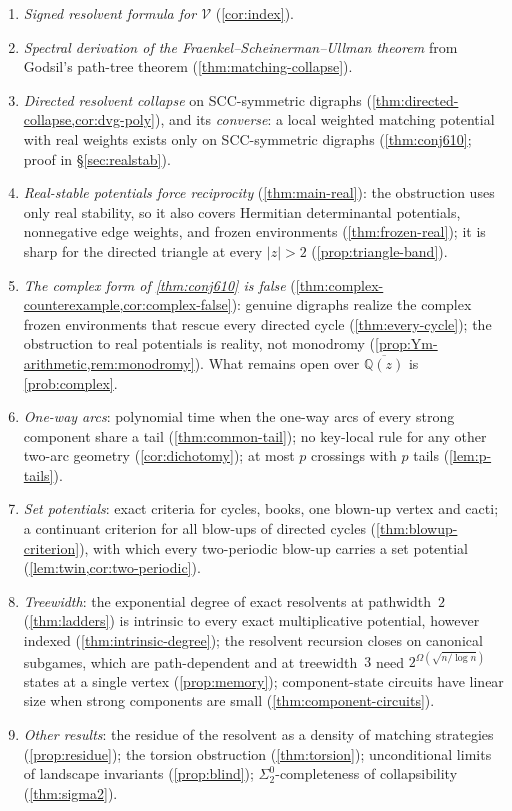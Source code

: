 \documentclass[final]{siamart0516}
\numberwithin{theorem}{section}
\numberwithin{equation}{section}
\theoremstyle{siamnonum}
\theoremstyle{plain}
\newcommand{\QQ}{\mathbb{Q}}
\newcommand{\Qzbar}{\overline{\QQ(z)}}
\newcommand{\val}{\mathcal{V}}            %
\begin{document}
\begin{enumerate}[label=(\arabic*)]
\item \emph{Signed resolvent formula for $\val$} (\cref{cor:index}).
\item \emph{Spectral derivation of the Fraenkel--Scheinerman--Ullman theorem} from Godsil's path-tree theorem (\cref{thm:matching-collapse}).
\item \emph{Directed resolvent collapse} on SCC-symmetric digraphs (\cref{thm:directed-collapse,cor:dvg-poly}), and its \emph{converse}: a local weighted matching potential with real weights exists only on SCC-symmetric digraphs (\cref{thm:conj610}; proof in \S\ref{sec:realstab}).
\item \emph{Real-stable potentials force reciprocity} (\cref{thm:main-real}): the obstruction uses only real stability, so it also covers Hermitian determinantal potentials, nonnegative edge weights, and frozen environments (\cref{thm:frozen-real}); it is sharp for the directed triangle at every $|z|>2$ (\cref{prop:triangle-band}).
\item \emph{The complex form of \cref{thm:conj610} is false} (\cref{thm:complex-counterexample,cor:complex-false}): genuine digraphs realize the complex frozen environments that rescue every directed cycle (\cref{thm:every-cycle}); the obstruction to real potentials is reality, not monodromy (\cref{prop:Ym-arithmetic,rem:monodromy}). What remains open over $\Qzbar$ is \cref{prob:complex}.
\item \emph{One-way arcs}: polynomial time when the one-way arcs of every strong component share a tail (\cref{thm:common-tail}); no key-local rule for any other two-arc geometry (\cref{cor:dichotomy}); at most $p$ crossings with $p$ tails (\cref{lem:p-tails}).
\item \emph{Set potentials}: exact criteria for cycles, books, one blown-up vertex and cacti; a continuant criterion for all blow-ups of directed cycles (\cref{thm:blowup-criterion}), with which every two-periodic blow-up carries a set potential (\cref{lem:twin,cor:two-periodic}).
\item \emph{Treewidth}: the exponential degree of exact resolvents at pathwidth~$2$ (\cref{thm:ladders}) is intrinsic to every exact multiplicative potential, however indexed (\cref{thm:intrinsic-degree}); the resolvent recursion closes on canonical subgames, which are path-dependent and at treewidth~$3$ need $2^{\Omega(\sqrt{n/\log n})}$ states at a single vertex (\cref{prop:memory}); component-state circuits have linear size when strong components are small (\cref{thm:component-circuits}).
\item \emph{Other results}: the residue of the resolvent as a density of matching strategies (\cref{prop:residue}); the torsion obstruction (\cref{thm:torsion}); unconditional limits of landscape invariants (\cref{prop:blind}); $\Sigma^0_2$-completeness of collapsibility (\cref{thm:sigma2}).
\end{enumerate}
\end{document}

